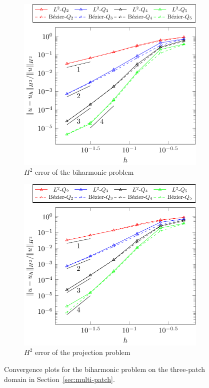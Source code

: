 \documentclass[preprint,12pt]{elsarticle}
\theoremstyle{remark}
\begin{document}
\begin{figure}
\begin{subfigure}{0.48\textwidth}
      \includegraphics[width=\linewidth]{three_patch_biharmonic_basic_H2}
      \caption{$H^2$ error of the biharmonic problem}
    \end{subfigure}\par\medskip
    \begin{subfigure}{0.48\textwidth}
      \centering
      \includegraphics[width=\linewidth]{three_patch_projection_basic_H2}
      \caption{$H^2$ error of the projection problem}
    \end{subfigure}%
    \caption{Convergence plots for the biharmonic problem on the three-patch domain in Section~\ref{sec:multi-patch}.}
    \label{fig:three_patch_result}
\end{figure}
\end{document}
